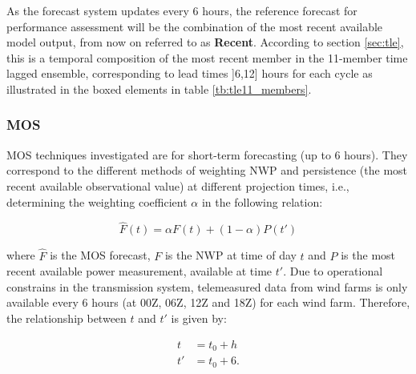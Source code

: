\begin{figure}[!htp]
    \centering
  \label{fig:parques_bxp_obs}
\end{figure}
\FloatBarrier

As the forecast system updates every 6 hours, the reference forecast for performance assessment will be the combination of the most recent available model output, from now on referred to as \textbf{Recent}. According to section \ref{sec:tle}, this is a temporal composition of the most recent member in the 11-member time lagged ensemble, corresponding to lead times ]6,12] hours for each cycle as illustrated in the boxed elements in table \ref{tb:tle11_members}. 
\subsubsection{MOS}

MOS techniques investigated are for short-term forecasting (up to 6 hours). They correspond to the different methods of weighting NWP and persistence (the most recent available observational value) at different projection times, i.e., determining the weighting coefficient $\alpha$ in the following relation:

\begin{equation}
    \hat{F}(t) = \alpha F(t) + (1-\alpha) P(t')
\end{equation}

where $\hat{F}$ is the MOS forecast, $F$ is the NWP at time of day $t$ and $P$ is the most recent available power measurement, available at time $t'$. Due to operational constrains in the transmission system, telemeasured data from wind farms is only available every 6 hours (at 00Z, 06Z, 12Z and 18Z) for each wind farm. Therefore, the relationship between $t$ and $t'$ is given by:

\begin{align}
    t & = t_0 + h \\
    t'& = t_0 + 6.
\end{align}

